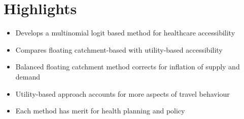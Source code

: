 \documentclass[]{elsarticle} %
\providecommand{\tightlist}{%
  \setlength{\itemsep}{0pt}\setlength{\parskip}{0pt}}
\begin{document}
\hypertarget{highlights}{%
\section{Highlights}\label{highlights}}

\begin{itemize}
\tightlist
\item
  Develops a multinomial logit based method for healthcare accessibility
\item
  Compares floating catchment-based with utility-based accessibility
\item
  Balanced floating catchment method corrects for inflation of supply
  and demand
\item
  Utility-based approach accounts for more aspects of travel behaviour
\item
  Each method has merit for health planning and policy
\end{itemize}
\end{document}
